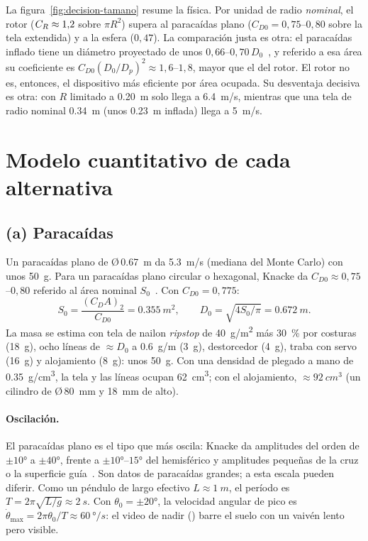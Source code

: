 La figura~\ref{fig:decision-tamano} resume la física. Por unidad de radio
\emph{nominal}, el rotor ($C_{R}\approx1{,}2$ sobre $\pi R^2$) supera al paracaídas plano
($C_{D0}=0{,}75$--$0{,}80$ sobre la tela extendida) y a la esfera ($0{,}47$). La
comparación justa es otra: el paracaídas inflado tiene un diámetro proyectado de unos
$0{,}66$--$0{,}70\,D_0$~\cite{knacke1992}, y referido a esa área su coeficiente es
$C_{D0}(D_0/D_p)^2\approx1{,}6$--$1{,}8$, mayor que el del rotor. El rotor no es, entonces, el
dispositivo más eficiente por área ocupada. Su desventaja decisiva es otra: con $R$
limitado a \SI{0.20}{m} solo llega a \SI{6.4}{m/s}, mientras que una tela de radio
nominal \SI{0.34}{m} (unos \SI{0.23}{m} inflada) llega a \SI{5}{m/s}.

\section{Modelo cuantitativo de cada alternativa}\label{sec:decision-modelos}

\subsection{(a) Paracaídas}\label{sec:decision-par}
Un paracaídas plano de Ø\,\SI{0.67}{m} da \SI{5.3}{m/s} (mediana del Monte Carlo) con
unos \SI{50}{g}. Para un paracaídas plano circular o hexagonal, Knacke da
$C_{D0}\approx0{,}75$--$0{,}80$ referido al área nominal $S_0$~\cite{knacke1992}. Con
$C_{D0}=0{,}775$:
\begin{equation}
  S_0=\frac{(C_DA)_2}{C_{D0}}=\SI{0.355}{m^2},\qquad D_0=\sqrt{4S_0/\pi}=\SI{0.672}{m}.
  \label{eq:decision-par}
\end{equation}
La masa se estima con tela de nailon \emph{ripstop} de \SI{40}{g/m^2} más
\SI{30}{\percent} por costuras (\SI{18}{g}), ocho líneas de $\approx D_0$ a
\SI{0.6}{g/m} (\SI{3}{g}), destorcedor (\SI{4}{g}), traba con servo (\SI{16}{g}) y
alojamiento (\SI{8}{g}): unos \SI{50}{g}. Con una densidad de plegado a mano de
\SI{0.35}{g/cm^3}, la tela y las líneas ocupan \SI{62}{cm^3}; con el alojamiento,
$\approx\SI{92}{cm^3}$ (un cilindro de Ø\,\SI{80}{mm} y \SI{18}{mm} de alto).

\paragraph{Oscilación.} El paracaídas plano es el tipo que más oscila: Knacke da
amplitudes del orden de $\pm\ang{10}$ a $\pm\ang{40}$, frente a $\pm\ang{10}$--$\ang{15}$
del hemisférico y amplitudes pequeñas de la cruz o la superficie guía~\cite{knacke1992}.
Son datos de paracaídas grandes; a esta escala pueden diferir. Como un
péndulo de largo efectivo $L\approx\SI{1}{m}$, el período es $T=2\pi\sqrt{L/g}\approx
\SI{2}{s}$. Con $\theta_0=\pm\ang{20}$, la velocidad angular de pico es
$\dot\theta_{\max}=2\pi\theta_0/T\approx\SI{60}{\degree/s}$: el video de nadir
() barre el suelo con un vaivén lento pero visible.

